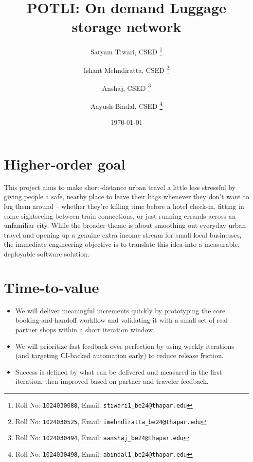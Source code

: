 \documentclass[11pt,a4paper]{article}
\title{POTLI: On demand Luggage storage network}
\author{
  Satyam Tiwari, CSED%
  \thanks{Roll No: \texttt{1024030088}, %
    Email: \texttt{stiwari1\_be24@thapar.edu}}
  \and
  Ishant Mehndiratta, CSED%
  \thanks{Roll No: \texttt{1024030525}, %
    Email: \texttt{imehndiratta\_be24@thapar.edu}}
  \and
  Anshaj, CSED%
  \thanks{Roll No: \texttt{1024030494}, %
    Email: \texttt{aanshaj\_be24@thapar.edu}}
  \and
  Aayush Bindal, CSED%
  \thanks{Roll No: \texttt{1024030498}, %
    Email: \texttt{abindal1\_be24@thapar.edu}}
}
\date{\today}
\begin{document}
\maketitle

\section{Higher-order goal}
This project aims to make short-distance urban travel a little less stressful
by giving people a safe, nearby place to leave their bags whenever they don't
want to lug them around -- whether they're killing time before a hotel
check-in, fitting in some sightseeing between train connections, or just
running errands across an unfamiliar city. While the broader theme is about
smoothing out everyday urban travel and opening up a genuine extra income
stream for small local businesses, the immediate engineering objective is to
translate this idea into a measurable, deployable software solution.

\section{Time-to-value}
\begin{itemize}[leftmargin=0.7cm]
    \item We will deliver meaningful increments quickly by prototyping the core booking-and-handoff workflow and validating it with a small set of real partner shops within a short iteration window.
    \item We will prioritize fast feedback over perfection by using weekly iterations (and targeting CI-backed automation early) to reduce release friction.
    \item Success is defined by what can be delivered and measured in the first iteration, then improved based on partner and traveler feedback.
\end{itemize}
\end{document}
